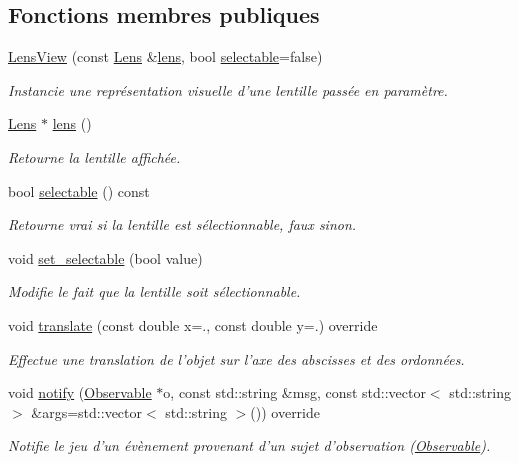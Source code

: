 \subsection*{Fonctions membres publiques}
\begin{DoxyCompactItemize}
\item 
\hyperlink{classLensView_a678ca25c84417e53af04258d27e5979a}{Lens\+View} (const \hyperlink{classLens}{Lens} \&\hyperlink{classLensView_a9af15abae80b9588e61de5a0d929101f}{lens}, bool \hyperlink{classLensView_abcf4b929c4008fe2d0d464e1ec113037}{selectable}=false)
\begin{DoxyCompactList}\small\item\em Instancie une représentation visuelle d’une lentille passée en paramètre. \end{DoxyCompactList}\item 
\hyperlink{classLens}{Lens} $\ast$ \hyperlink{classLensView_a9af15abae80b9588e61de5a0d929101f}{lens} ()
\begin{DoxyCompactList}\small\item\em Retourne la lentille affichée. \end{DoxyCompactList}\item 
bool \hyperlink{classLensView_abcf4b929c4008fe2d0d464e1ec113037}{selectable} () const 
\begin{DoxyCompactList}\small\item\em Retourne vrai si la lentille est sélectionnable, faux sinon. \end{DoxyCompactList}\item 
void \hyperlink{classLensView_a3a35c1e61503da599b1d9c93c176dffd}{set\+\_\+selectable} (bool value)
\begin{DoxyCompactList}\small\item\em Modifie le fait que la lentille soit sélectionnable. \end{DoxyCompactList}\item 
void \hyperlink{classLensView_a9475ad917b91f93c23742f403ff152fc}{translate} (const double x=., const double y=.) override
\begin{DoxyCompactList}\small\item\em Effectue une translation de l’objet sur l’axe des abscisses et des ordonnées. \end{DoxyCompactList}\item 
void \hyperlink{classLensView_a09506e0da9265c47140ded3e6eb35a7f}{notify} (\hyperlink{classObservable}{Observable} $\ast$o, const std\+::string \&msg, const std\+::vector$<$ std\+::string $>$ \&args=std\+::vector$<$ std\+::string $>$()) override
\begin{DoxyCompactList}\small\item\em Notifie le jeu d'un évènement provenant d'un sujet d'observation (\hyperlink{classObservable}{Observable}). \end{DoxyCompactList}\end{DoxyCompactItemize}
